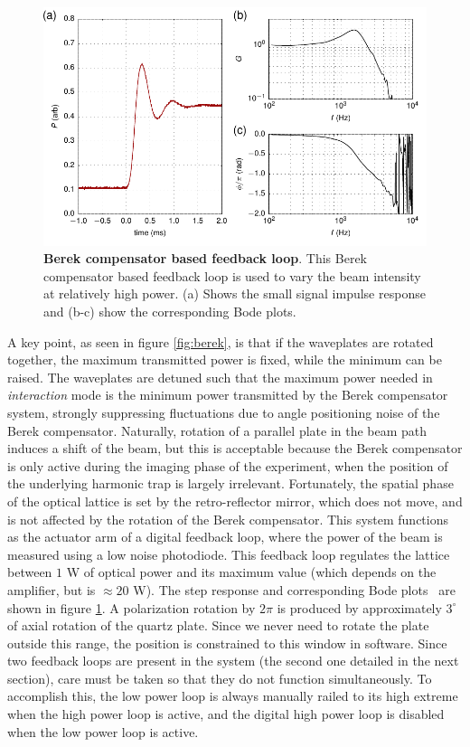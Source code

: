 \documentclass[twocolumn,aps,pra,showpacs,preprintnumbers,bibnotes]{revtex4-1}
\begin{document}
\begin{figure}
  \begin{center}
    \includegraphics[width=\columnwidth]{fig/step_response.pdf}
    \caption{\textbf{Berek compensator based feedback loop}. This Berek compensator based feedback loop is used to vary the beam intensity at relatively high power. (a) Shows the small signal impulse response and (b-c) show the corresponding Bode plots.}\label{fig:berek_step_response}
  \end{center}
\end{figure}
A key point, as seen in figure \ref{fig:berek}, is that if the waveplates are rotated together, the maximum transmitted power is fixed, while the minimum can be raised.
The waveplates are detuned such that the maximum power needed in \textit{interaction} mode is the minimum power transmitted by the Berek compensator system, strongly suppressing fluctuations due to angle positioning noise of the Berek compensator. 
Naturally, rotation of a parallel plate in the beam path induces a shift of the beam, but this is acceptable because the Berek compensator is only active during the imaging phase of the experiment, when the position of the underlying harmonic trap is largely irrelevant.
Fortunately, the spatial phase of the optical lattice is set by the retro-reflector mirror, which does not move, and is not affected by the rotation of the Berek compensator.
This system functions as the actuator arm of a digital feedback loop, where the power of the beam is measured using a low noise photodiode. This feedback loop regulates the lattice between $1$ W of optical power and its maximum value (which depends on the amplifier, but is $\approx20$ W).
The step response and corresponding Bode plots~\cite{Bechhoefer2005} are shown in figure \ref{fig:berek_step_response}.
A polarization rotation by $2 \pi$ is produced by approximately $3^\circ$ of axial rotation of the quartz plate. 
Since we never need to rotate the plate outside this range, the position is constrained to this window in software.
Since two feedback loops are present in the system (the second one detailed in the next section), care must be taken so that they do not function simultaneously. 
To accomplish this, the low power loop is always manually railed to its high extreme when the high power loop is active, and the digital high power loop is disabled when the low power loop is active.
\end{document}
